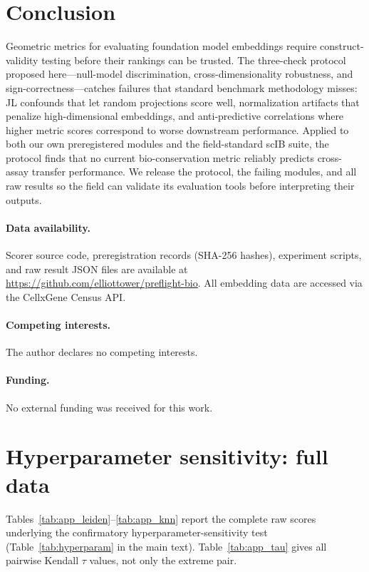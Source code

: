 \documentclass[10pt,letterpaper]{article}
\begin{document}
\section{Conclusion}

Geometric metrics for evaluating foundation model embeddings require construct-validity testing before their rankings can be trusted. The three-check protocol proposed here---null-model discrimination, cross-dimensionality robustness, and sign-correctness---catches failures that standard benchmark methodology misses: JL confounds that let random projections score well, normalization artifacts that penalize high-dimensional embeddings, and anti-predictive correlations where higher metric scores correspond to worse downstream performance. Applied to both our own preregistered modules and the field-standard scIB suite, the protocol finds that no current bio-conservation metric reliably predicts cross-assay transfer performance. We release the protocol, the failing modules, and all raw results so the field can validate its evaluation tools before interpreting their outputs.

\paragraph{Data availability.} Scorer source code, preregistration records (SHA-256 hashes), experiment scripts, and raw result JSON files are available at \url{https://github.com/elliottower/preflight-bio}. All embedding data are accessed via the CellxGene Census API.

\paragraph{Competing interests.} The author declares no competing interests.

\paragraph{Funding.} No external funding was received for this work.


\appendix

\section{Hyperparameter sensitivity: full data}
\label{app:hyperparam}

Tables~\ref{tab:app_leiden}--\ref{tab:app_knn} report the complete raw scores underlying the confirmatory hyperparameter-sensitivity test (Table~\ref{tab:hyperparam} in the main text). Table~\ref{tab:app_tau} gives all pairwise Kendall $\tau$ values, not only the extreme pair.
\end{document}
